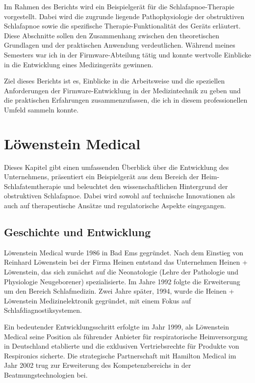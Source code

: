 \documentclass[a4paper, 12pt]{article}
\begin{document}
Im Rahmen des Berichts wird ein Beispielgerät für die Schlafapnoe-Therapie vorgestellt. Dabei wird die zugrunde liegende Pathophysiologie der obstruktiven Schlafapnoe sowie die spezifische Therapie-Funktionalität des Geräts erläutert. Diese Abschnitte sollen den Zusammenhang zwischen den theoretischen Grundlagen und der praktischen Anwendung verdeutlichen. Während meines Semesters war ich in der Firmware-Abteilung tätig und konnte wertvolle Einblicke in die Entwicklung eines Medizingeräts gewinnen.

Ziel dieses Berichts ist es, Einblicke in die Arbeitsweise und die speziellen Anforderungen der Firmware-Entwicklung in der Medizintechnik zu geben und die praktischen Erfahrungen zusammenzufassen, die ich in diesem professionellen Umfeld sammeln konnte. 

\newpage
\section{Löwenstein Medical}\label{loewenstein}
Dieses Kapitel gibt einen umfassenden Überblick über die Entwicklung des Unternehmens, präsentiert ein Beispielgerät aus dem Bereich der Heim-Schlafatemtherapie und beleuchtet den wissenschaftlichen Hintergrund der obstruktiven Schlafapnoe. Dabei wird sowohl auf technische Innovationen als auch auf therapeutische Ansätze und regulatorische Aspekte eingegangen.

\subsection{Geschichte und Entwicklung}
Löwenstein Medical wurde 1986 in Bad Ems gegründet. Nach dem Einstieg von Reinhard Löwenstein bei der Firma Heinen entstand das Unternehmen Heinen + Löwenstein, das sich zunächst auf die Neonatologie (Lehre der Pathologie und Physiologie Neugeborener) spezialisierte. Im Jahre 1992 folgte die Erweiterung um den Bereich Schlafmedizin. Zwei Jahre später, 1994, wurde die Heinen + Löwenstein Medizinelektronik gegründet, mit einem Fokus auf Schlafdiagnostiksystemen.

Ein bedeutender Entwicklungsschritt erfolgte im Jahr 1999, als Löwenstein Medical seine Position als führender Anbieter für respiratorische Heimversorgung in Deutschland etablierte und die exklusiven Vertriebsrechte für Produkte von Respironics sicherte. Die strategische Partnerschaft mit Hamilton Medical im Jahr 2002 trug zur Erweiterung des Kompetenzbereichs in der Beatmungstechnologien bei.
\end{document}
